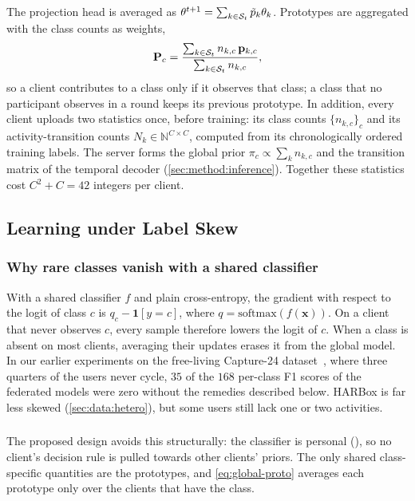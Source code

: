 The projection head is averaged as $\theta^{t+1}=\sum_{k\in\mathcal{S}_t}\tilde{p}_k\theta_k$. Prototypes are
aggregated with the class counts as weights,
\begin{equation}\label{eq:global-proto}
  \mathbf{P}_c=\frac{\sum_{k\in\mathcal{S}_t}n_{k,c}\,\mathbf{p}_{k,c}}{\sum_{k\in\mathcal{S}_t}n_{k,c}},
\end{equation}
so a client contributes to a class only if it observes that class; a class that no participant
observes in a round keeps its previous prototype. In addition, every client uploads two
statistics once, before training: its class counts $\{n_{k,c}\}_c$ and its activity-transition
counts $N_k\in\mathbb{N}^{C\times C}$, computed from its chronologically ordered training labels.
The server forms the global prior $\pi_c\propto\sum_kn_{k,c}$ and the transition matrix of the
temporal decoder (\cref{sec:method:inference}). Together these statistics cost
$C^2+C=42$ integers per client.

\subsection{Learning under Label Skew}\label{sec:method:skew}

\subsubsection{Why rare classes vanish with a shared classifier}
With a shared classifier $f$ and plain cross-entropy, the gradient with respect to the logit of
class $c$ is $q_c-\mathbf{1}[y=c]$, where $q=\mathrm{softmax}(f(\mathbf{x}))$. On a client that
never observes $c$, every sample therefore lowers the logit of $c$. When a class is absent on
most clients, averaging their updates erases it from the global model. In our earlier experiments
on the free-living Capture-24 dataset~\cite{chan2024capture24}, where three quarters of the users
never cycle, $35$ of the $168$ per-class F1 scores of the federated models were zero without the
remedies described below. HARBox is far less skewed (\cref{sec:data:hetero}), but some users still
lack one or two activities.

\subsubsection{\method}
The proposed design avoids this structurally: the classifier is personal (), so no
client's decision rule is pulled towards other clients' priors. The only shared class-specific
quantities are the prototypes, and \cref{eq:global-proto} averages each prototype only over the
clients that have the class.

